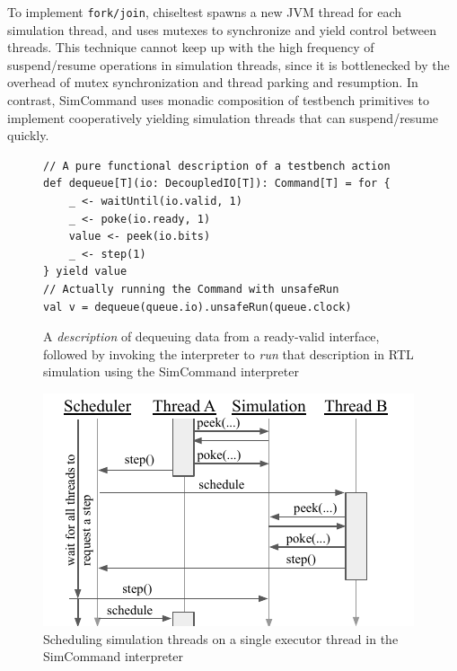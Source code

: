 \documentclass[sigplan,review,nonacm,9pt]{acmart}
\begin{document}

To implement \texttt{fork/join}, chiseltest spawns a new JVM thread for each simulation thread, and uses mutexes to synchronize and yield control between threads.
This technique cannot keep up with the high frequency of suspend/resume operations in simulation threads, since it is bottlenecked by the overhead of mutex synchronization and thread parking and resumption.
In contrast, SimCommand uses monadic composition of testbench primitives\cite{hardcaml_step_testbench} to implement cooperatively yielding simulation threads that can suspend/resume quickly.

\begin{figure}
\begin{verbatim}
// A pure functional description of a testbench action
def dequeue[T](io: DecoupledIO[T]): Command[T] = for {
    _ <- waitUntil(io.valid, 1)
    _ <- poke(io.ready, 1)
    value <- peek(io.bits)
    _ <- step(1)
} yield value
// Actually running the Command with unsafeRun
val v = dequeue(queue.io).unsafeRun(queue.clock)
\end{verbatim}
\caption{A \textit{description} of dequeuing data from a ready-valid interface, followed by invoking the interpreter to \textit{run} that description in RTL simulation using the SimCommand interpreter}
\label{fig:simcommand}
\end{figure}

\begin{figure}
\includegraphics[scale=1]{simcommand/scheduler.pdf}
\caption{Scheduling simulation threads on a single executor thread in the SimCommand interpreter}
\label{fig:simcommand_interp}
\end{figure}
\end{document}
